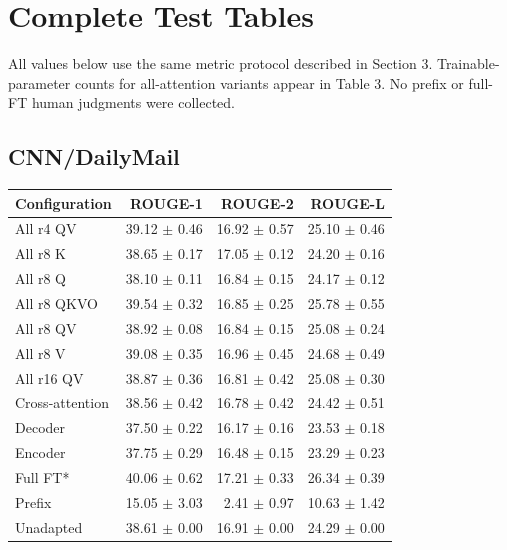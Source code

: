 \documentclass[11pt,letterpaper]{article}
\begin{document}
\section{Complete Test Tables}
All values below use the same metric protocol described in Section 3. Trainable-parameter counts for all-attention variants appear in Table 3. No prefix or full-FT human judgments were collected.
\subsection{CNN/DailyMail}
\begin{center}\small
\begin{tabular}{lrrr}\toprule Configuration & ROUGE-1 & ROUGE-2 & ROUGE-L\\\midrule
All r4 QV & 39.12 $\pm$ 0.46 & 16.92 $\pm$ 0.57 & 25.10 $\pm$ 0.46\\
All r8 K & 38.65 $\pm$ 0.17 & 17.05 $\pm$ 0.12 & 24.20 $\pm$ 0.16\\
All r8 Q & 38.10 $\pm$ 0.11 & 16.84 $\pm$ 0.15 & 24.17 $\pm$ 0.12\\
All r8 QKVO & 39.54 $\pm$ 0.32 & 16.85 $\pm$ 0.25 & 25.78 $\pm$ 0.55\\
All r8 QV & 38.92 $\pm$ 0.08 & 16.84 $\pm$ 0.15 & 25.08 $\pm$ 0.24\\
All r8 V & 39.08 $\pm$ 0.35 & 16.96 $\pm$ 0.45 & 24.68 $\pm$ 0.49\\
All r16 QV & 38.87 $\pm$ 0.36 & 16.81 $\pm$ 0.42 & 25.08 $\pm$ 0.30\\
Cross-attention & 38.56 $\pm$ 0.42 & 16.78 $\pm$ 0.42 & 24.42 $\pm$ 0.51\\
Decoder & 37.50 $\pm$ 0.22 & 16.17 $\pm$ 0.16 & 23.53 $\pm$ 0.18\\
Encoder & 37.75 $\pm$ 0.29 & 16.48 $\pm$ 0.15 & 23.29 $\pm$ 0.23\\
Full FT* & 40.06 $\pm$ 0.62 & 17.21 $\pm$ 0.33 & 26.34 $\pm$ 0.39\\
Prefix & 15.05 $\pm$ 3.03 & 2.41 $\pm$ 0.97 & 10.63 $\pm$ 1.42\\
Unadapted & 38.61 $\pm$ 0.00 & 16.91 $\pm$ 0.00 & 24.29 $\pm$ 0.00\\
\bottomrule\end{tabular}
\end{center}
\end{document}
